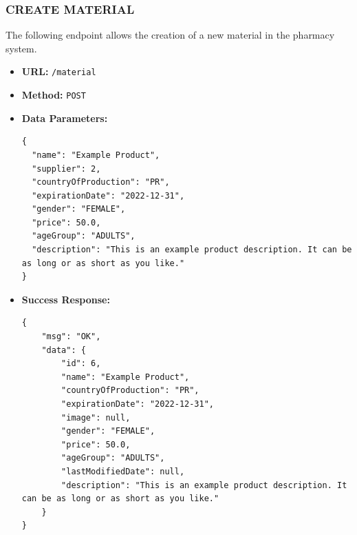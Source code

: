 \subsubsection*{CREATE MATERIAL}
The following endpoint allows the creation of a new material in the pharmacy system.
\begin{itemize}
    \item \textbf{URL:}
    \newline \hspace*{1cm} \texttt{/material}  
    \item \textbf{Method:}
    \newline \hspace*{1cm}\texttt{POST}
    \item \textbf{Data Parameters:}
\begin{lstlisting}[breaklines]
{
  "name": "Example Product",
  "supplier": 2,
  "countryOfProduction": "PR",
  "expirationDate": "2022-12-31",
  "gender": "FEMALE",
  "price": 50.0,
  "ageGroup": "ADULTS",
  "description": "This is an example product description. It can be as long or as short as you like."
}

\end{lstlisting}
    \item \textbf{Success Response:}
\begin{lstlisting}[breaklines]
{
    "msg": "OK",
    "data": {
        "id": 6,
        "name": "Example Product",
        "countryOfProduction": "PR",
        "expirationDate": "2022-12-31",
        "image": null,
        "gender": "FEMALE",
        "price": 50.0,
        "ageGroup": "ADULTS",
        "lastModifiedDate": null,
        "description": "This is an example product description. It can be as long or as short as you like."
    }
}

\end{lstlisting}
\end{itemize}

